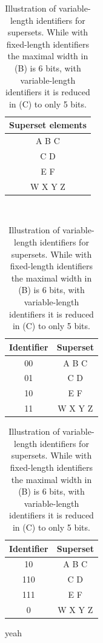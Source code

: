 \begin{table}[t!]
\small

\centering
\begin{subtable}[t]{0.35\linewidth}
\caption{Supersets}
\begin{tabular}{|c|}
\hline
Superset elements\\
\hline
A B C\\
C D\\
E F\\
W X Y Z\\
\hline
\end{tabular}
\label{Table_variable_a}
\end{subtable}\\


\begin{subtable}[t]{0.49\linewidth}
\caption{Fixed-length Identifiers}
\begin{tabular}{|c|c|}
\hline
Identifier   &  Superset\\
\hline
00 & A B C\\
01 &  C D\\
10 &  E F\\
11 &  W X Y Z\\
\hline
\end{tabular}
\label{Table_variable_b}
\end{subtable}
\hfill
\begin{subtable}[t]{0.49\linewidth}
\caption{Variable-length Identifiers}
\begin{tabular}{|c|c|}
\hline
Identifier   &  Superset\\
\hline
10 & A B C\\
110 &  C D\\
111 &  E F\\
0 &  W X Y Z\\
\hline
\end{tabular}
\label{Table_variable_c}
\end{subtable}

\caption{Illustration of variable-length identifiers for supersets. While with fixed-length identifiers the maximal width in (B) is 6 bits, with variable-length identifiers it is reduced in (C) to only 5 bits.
}
\label{Table_variable}
\end{table}


yeah

